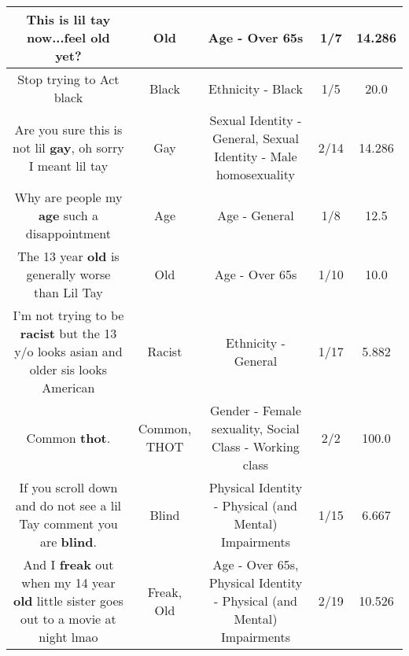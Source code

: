 \documentclass[11pt]{article}
\newlength\mylength
\begin{document}
\begin{center}
\begin{longtable}{|C{.65\mylength}|C{.30\mylength}|C{.12\mylength}|C{.12\mylength}|C{.12\mylength}|}
  \small This is lil tay now...feel \textbf{old} yet?\normalsize   & Old & Age - Over 65s & 1/7 & 14.286 \\  \hline
  \small Stop trying to Act black\normalsize   & Black & Ethnicity - Black & 1/5 & 20.0 \\  \hline
  \small Are you sure this is not lil \textbf{g\textbf{ay}}, oh sorry I meant lil tay\normalsize   & Gay & Sexual Identity - General, Sexual Identity - Male homosexuality & 2/14 & 14.286 \\  \hline
  \small Why are people my \textbf{age} such a disappointment\normalsize   & Age & Age - General & 1/8 & 12.5 \\  \hline
  \small The 13 year \textbf{old} is generally worse than Lil Tay\normalsize   & Old & Age - Over 65s & 1/10 & 10.0 \\  \hline
  \small I'm not trying to be \textbf{racist} but the 13 y/o looks asian and older sis looks American\normalsize   & Racist & Ethnicity - General & 1/17 & 5.882 \\  \hline
  \small Common \textbf{thot}.\normalsize   & Common, THOT & Gender - Female sexuality, Social Class - Working class & 2/2 & 100.0 \\  \hline
  \small If you scroll down and do not see a lil Tay comment you are \textbf{blind}.\normalsize   & Blind & Physical Identity - Physical (and Mental) Impairments & 1/15 & 6.667 \\  \hline
  \small And I \textbf{freak} out when my 14 year \textbf{old} little sister goes out to a movie at night lmao\normalsize   & Freak, Old & Age - Over 65s, Physical Identity - Physical (and Mental) Impairments & 2/19 & 10.526 \\  \hline

\end{longtable}
\end{center}
\end{document}
